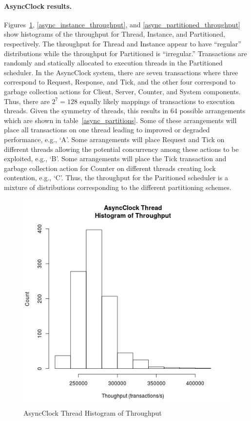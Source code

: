 \paragraph{AsyncClock results.}
Figures~\ref{async_thread_throughput}, \ref{async_instance_throughput}, and \ref{async_partitioned_throughput} show histograms of the throughput for Thread, Instance, and Partitioned, respectively.
The throughput for Thread and Instance appear to have ``regular'' distributions while the throughput for Partitioned is ``irregular.''
Transactions are randomly and statically allocated to execution threads in the Partitioned scheduler.
In the AsyncClock system, there are seven transactions where three correspond to Request, Response, and Tick, and the other four correspond to garbage collection actions for Client, Server, Counter, and System components.
Thus, there are $2^7 = 128$ equally likely mappings of transactions to execution threads.
Given the symmetry of threads, this results in 64 possible arrangements which are shown in table~\ref{async_partitions}.
Some of these arrangements will place all transactions on one thread leading to improved or degraded performance, e.g., `A'.
Some arrangements will place Request and Tick on different threads allowing the potential concurrency among these actions to be exploited, e.g., `B'.
Some arrangements will place the Tick transaction and garbage collection action for Counter on different threads creating lock contention, e.g., `C'.
Thus, the throughput for the Paritioned scheduler is a mixture of distributions corresponding to the different partitioning schemes.

\begin{figure}
\center
\includegraphics[height=.4\textheight]{async_thread_throughput_hist.png}
\caption{AsyncClock Thread Histogram of Throughput}
\label{async_thread_throughput}
\end{figure}


